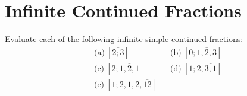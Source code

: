 \section{Infinite Continued Fractions}

\begin{exercise}
    Evaluate each of the following infinite simple continued fractions:
    \begin{align*}
        &\text{(a)} \ [\overline{2; 3}] & &\text{(b)} \ [0; \overline{1, 2, 3}]  \\
        &\text{(c)} \ [2; \overline{1, 2, 1}] & &\text{(d)} \ [1; 2, \overline{3, 1}]  \\
        &\text{(e)} \ [1; 2, 1, 2, \overline{12}] & & 
    \end{align*}
\end{exercise}

